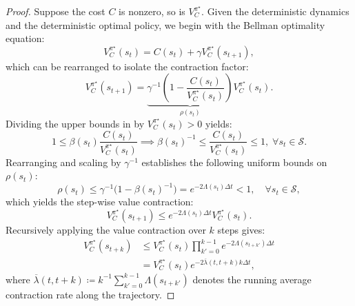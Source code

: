 \documentclass[lettersize,journal]{IEEEtran}
\newcommand{\mc}{\mathcal}
\begin{document}
\begin{proof}
    Suppose the cost $C$ is nonzero, so is $V_C^{\pi^\star}$. 
    Given the deterministic dynamics and the deterministic optimal policy, we begin with the Bellman optimality equation:
    \begin{equation}
        V^{\pi^\star}_C(s_t) = C(s_t) + \gamma V^{\pi^\star}_C(s_{t+1}),
    \end{equation}
    which can be rearranged to isolate the contraction factor:
    \begin{equation}
        V^{\pi^\star}_C(s_{t+1}) = \underbrace{ \gamma^{-1}\left( 1 - \frac{C(s_t)}{V^{\pi^\star}_C(s_{t})} \right)}_{\rho(s_t)}V^{\pi^\star}_C(s_{t}).
    \end{equation}
    Dividing the upper bounds in  by $V^{\pi^\star}_C(s_t) > 0$ yields:
    \begin{equation}\label{eqn:beta_prime_value_bound}
        1 \leq \beta(s_t) \frac{C(s_t)}{V^{\pi^\star}_C(s_t)} \implies {\beta(s_t)}^{-1} \le \frac{C(s_t)}{V^{\pi^\star}_{C}(s_t)} \leq 1, \; \forall s_t \in \mc{S}.
    \end{equation}
    Rearranging  and scaling by $\gamma^{-1}$ establishes the following uniform bounds on $\rho(s_t)$:
    \begin{equation}
        \rho(s_t) \leq \gamma^{-1}\big(1-{\beta(s_t)}^{-1}\big) = e^{-2 \Lambda(s_t) \Delta t} < 1, \quad \forall s_t \in \mc{S},
    \end{equation}
    which yields the step-wise value contraction:
    \begin{equation}
        V^{\pi^\star}_C(s_{t+1}) \leq e^{-2 \Lambda(s_t) \Delta t} V^{\pi^\star}_C(s_{t}).
    \end{equation}
    Recursively applying the value contraction over $k$ steps gives:
    \begin{align}
        V^{\pi^\star}_C(s_{t+k}) & \leq V^{\pi^\star}_C(s_{t}) \prod_{k'=0}^{k-1} e^{-2 \Lambda(s_{t + k'}) \Delta t} \\
        &= V^{\pi^\star}_C(s_{t}) e^{-2 \overline{\lambda}(t, t+k) k \Delta t},
    \end{align}
    where $\overline{\lambda}(t, t+k) \coloneq k^{-1} \sum_{k'=0}^{k-1} \Lambda(s_{t+k'})$ denotes the running average contraction rate along the trajectory. 
\end{proof}
\end{document}
